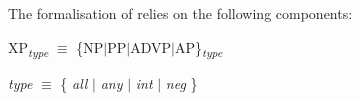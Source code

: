 \documentclass[output=paper]{../langscibook}
\begin{document}
The formalisation of \citet{Patejuk2015} relies on the following
components:

\ea\label{ex:Patejuk2015:5.213}
\z

\ea\label{ex:Patejuk2015:5.209}
\z

\ea\label{ex:Patejuk2015:5.125}
XP\textsubscript{\textit{type}} $\equiv$ \{NP$\vert$PP$\vert$ADVP$\vert$AP\}\textsubscript{\textit{type}}\z

\ea\label{ex:Patejuk2015:5.126}
    \textit{type} $\equiv$  \{ \textit{all} $\vert$ \textit{any} $\vert$ \textit{int} $\vert$ \textit{neg} \}
\z
\end{document}

